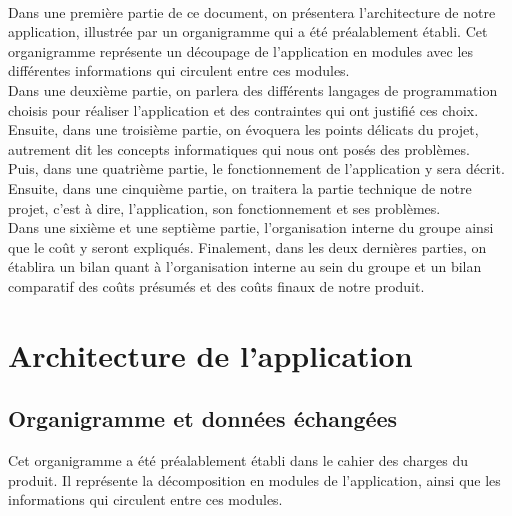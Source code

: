 		\paragraph{}Dans une première partie de ce document, on présentera l'architecture de notre application, illustrée par un organigramme qui a été préalablement établi. Cet organigramme représente un découpage de l'application en modules avec les différentes informations qui circulent entre ces modules.\\
	Dans une deuxième partie, on parlera des différents langages de programmation choisis pour réaliser l'application et des contraintes qui ont justifié ces choix.\\
	Ensuite, dans une troisième partie, on évoquera les points délicats du projet, autrement dit les concepts informatiques qui nous ont posés des problèmes.\\
	Puis, dans une quatrième partie, le fonctionnement de l'application y sera décrit.\\
	Ensuite, dans une cinquième partie, on traitera la partie technique de notre projet, c'est à dire, l'application, son fonctionnement et ses problèmes.\\
	Dans une sixième et une septième partie, l'organisation interne du groupe ainsi que le coût y seront expliqués.
	Finalement, dans les deux dernières parties, on établira un bilan quant à l'organisation interne au sein du groupe et un bilan comparatif des coûts présumés et des coûts finaux de notre produit.\\

	
	\section{Architecture de l'application}
		\subsection{Organigramme et données échangées}
		Cet organigramme a été préalablement établi dans le cahier des charges du produit. Il représente la décomposition en modules de l'application, ainsi que les informations qui circulent entre ces modules.
		
